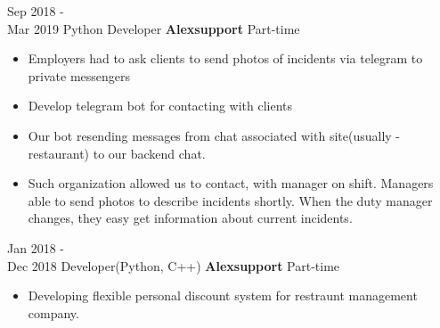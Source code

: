 \documentclass[letterpaper]{twentysecondcv} %
\begin{document}
\begin{twenty}
{\begin{itemize}
            \end{itemize}
        }
    \twentyitem
        {Sep 2018 - \\ Mar 2019}
        {Python Developer}
        {\textbf{Alexsupport}}
        {Part-time}
        {
            \begin{itemize}
                \item Employers had to ask clients to send photos of incidents via telegram to private messengers
                \item Develop telegram bot for contacting with clients
                \item Our bot resending messages from chat associated with site(usually - restaurant) to
                our backend chat.
                \item Such organization allowed us to contact, with manager on shift. Managers able to send
                photos to describe incidents shortly. When the duty manager changes, they easy get information about
                current incidents.
            \end{itemize}
        }
    \twentyitem
        {Jan 2018 - \\ Dec 2018}
        {Developer(Python, C++) }
        {\textbf{Alexsupport}}
        {Part-time}
        {
            \begin{itemize}
                \item Developing flexible personal discount system for restraunt management company.
            \end{itemize}
        }
\end{twenty}

\pagebreak[4]
\makesidebar
\end{document}

